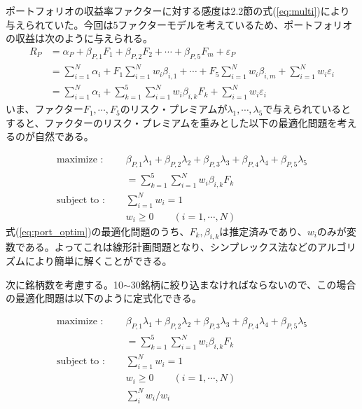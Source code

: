 \documentclass[11pt]{jreport}
\begin{document}
ポートフォリオの収益率ファクターに対する感度は2.2節の式(\ref{eq:multi})により与えられていた。今回は5ファクターモデルを考えているため、ポートフォリオの収益は次のように与えられる。
\begin{equation}
\begin{split}
R_P &= \alpha_P + \beta_{P,1} F_1 + \beta_{P,2} F_2 + \cdots + \beta_{P,5} F_m + \varepsilon_P\\
&=\sum_{i=1}^N \alpha_i + F_1 \sum_{i=1}^N w_i \beta_{i,1} + \cdots + F_5 \sum_{i=1}^N w_i \beta_{i,m} + \sum_{i=1}^N w_i\varepsilon_i\\
&= \sum_{i=1}^N \alpha_i + \sum_{k=1}^5 \sum_{i=1}^N w_i \beta_{i,k} F_k + \sum_{i=1}^N w_i\varepsilon_i
\label{eq:port}
\end{split}
\end{equation}
いま、ファクター$F_1,\cdots,F_5$のリスク・プレミアムが$\lambda_1,\cdots,\lambda_5$で与えられているとすると、ファクターのリスク・プレミアムを重みとした以下の最適化問題を考えるのが自然である。

\begin{equation}
\begin{split}
\text{maximize : }\quad & \beta_{P,1}\lambda_1 + \beta_{P,2}\lambda_2 + \beta_{P,3}\lambda_3 + \beta_{P,4}\lambda_4 + \beta_{P,5}\lambda_5\\
& = \sum_{k=1}^5 \sum_{i=1}^N w_i \beta_{i,k} F_k\\
\text{subject to : }\quad & \sum_{i=1}^N w_i = 1\\
& w_i \geq 0\qquad(i=1,\cdots,N)
\end{split}
\label{eq:port_optim}
\end{equation}
式(\ref{eq:port_optim})の最適化問題のうち、$F_k, \beta_{i,k}$は推定済みであり、$w_i$のみが変数である。よってこれは線形計画問題となり、シンプレックス法などのアルゴリズムにより簡単に解くことができる。

次に銘柄数を考慮する。10$\sim$30銘柄に絞り込まなければならないので、この場合の最適化問題は以下のように定式化できる。

\begin{equation}
\begin{split}
\text{maximize : }\quad & \beta_{P,1}\lambda_1 + \beta_{P,2}\lambda_2 + \beta_{P,3}\lambda_3 + \beta_{P,4}\lambda_4 + \beta_{P,5}\lambda_5\\
& = \sum_{k=1}^5 \sum_{i=1}^N w_i \beta_{i,k} F_k\\
\text{subject to : }\quad & \sum_{i=1}^N w_i = 1\\
& w_i \geq 0\qquad(i=1,\cdots,N)\\
& \sum_i^N w_i / w_i
\end{split}
\label{eq:port_optim}
\end{equation}
\end{document}
